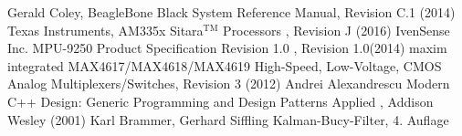 \begin{thebibliography}{999}
 Gerald Coley, \glqq BeagleBone Black System Reference Manual\grqq , Revision C.1 (2014)
 Texas Instruments, \glqq AM335x Sitara$^{\text{TM}}$ Processors \grqq, Revision J (2016)
 IvenSense Inc. \glqq MPU-9250 Product Specification Revision 1.0 \grqq, Revision 1.0(2014)
 maxim integrated \glqq MAX4617/MAX4618/MAX4619 High-Speed, Low-Voltage, CMOS Analog Multiplexers/Switches\grqq, Revision 3 (2012)
 Andrei Alexandrescu \glqq Modern C++ Design: Generic Programming and Design Patterns Applied \grqq, Addison Wesley (2001)
 Karl Brammer, Gerhard Siffling \glqq Kalman-Bucy-Filter\grqq, 4. Auflage


\end{thebibliography}